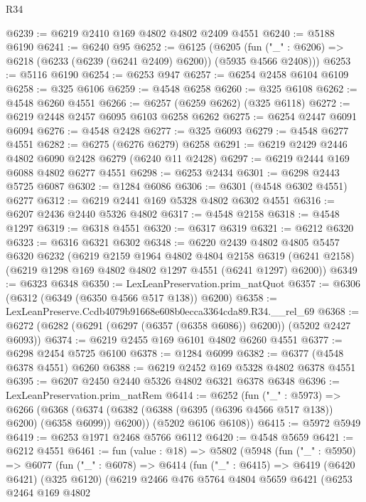 \begin{lexlean}{R34}
\begin{coremodule}
@6239 := @6219 @2410 @169 @4802 @4802 @2409 @4551
@6240 := @5188 @6190
@6241 := @6240 @95
@6252 := @6125
    (@6205 (fun ("_" : @6206) => @6218 (@6233 (@6239 (@6241 @2409) @6200)) (@5935 @4566 @2408)))
@6253 := @5116 @6190
@6254 := @6253 @947
@6257 := @6254 @2458 @6104 @6109
@6258 := @325 @6106
@6259 := @4548 @6258
@6260 := @325 @6108
@6262 := @4548 @6260 @4551
@6266 := @6257 (@6259 @6262) (@325 @6118)
@6272 := @6219 @2448 @2457 @6095 @6103 @6258 @6262
@6275 := @6254 @2447 @6091 @6094
@6276 := @4548 @2428
@6277 := @325 @6093
@6279 := @4548 @6277 @4551
@6282 := @6275 (@6276 @6279) @6258
@6291 := @6219 @2429 @2446 @4802 @6090 @2428 @6279 (@6240 @11 @2428)
@6297 := @6219 @2444 @169 @6088 @4802 @6277 @4551
@6298 := @6253 @2434
@6301 := @6298 @2443 @5725 @6087
@6302 := @1284 @6086
@6306 := @6301 (@4548 @6302 @4551) @6277
@6312 := @6219 @2441 @169 @5328 @4802 @6302 @4551
@6316 := @6207 @2436 @2440 @5326 @4802
@6317 := @4548 @2158
@6318 := @4548 @1297
@6319 := @6318 @4551
@6320 := @6317 @6319
@6321 := @6212 @6320
@6323 := @6316 @6321 @6302
@6348 := @6220
    @2439
    @4802
    @4805
    @5457
    @6320
    @6232
    (@6219
      @2159
      @1964
      @4802
      @4804
      @2158
      @6319
      (@6241 @2158)
      (@6219 @1298 @169 @4802 @4802 @1297 @4551 (@6241 @1297) @6200))
@6349 := @6323 @6348
@6350 := LexLeanPreservation.prim_natQuot
@6357 := @6306 (@6312 (@6349 (@6350 @4566 @517 @138)) @6200)
@6358 := LexLeanPreserve.Ccdb4079b91668e608b0ecca3364cda89.R34.__rel_69
@6368 := @6272 (@6282 (@6291 (@6297 (@6357 (@6358 @6086)) @6200)) (@5202 @2427 @6093))
@6374 := @6219 @2455 @169 @6101 @4802 @6260 @4551
@6377 := @6298 @2454 @5725 @6100
@6378 := @1284 @6099
@6382 := @6377 (@4548 @6378 @4551) @6260
@6388 := @6219 @2452 @169 @5328 @4802 @6378 @4551
@6395 := @6207 @2450 @2440 @5326 @4802 @6321 @6378 @6348
@6396 := LexLeanPreservation.prim_natRem
@6414 := @6252
    (fun ("_" : @5973) =>
    @6266
      (@6368 (@6374 (@6382 (@6388 (@6395 (@6396 @4566 @517 @138)) @6200) (@6358 @6099)) @6200))
      (@5202 @6106 @6108))
@6415 := @5972 @5949
@6419 := @6253 @1971 @2468 @5766 @6112
@6420 := @4548 @5659
@6421 := @6212 @4551
@6461 := fun (value : @18) =>
  @5802
    (@5948
      (fun ("_" : @5950) =>
      @6077
        (fun ("_" : @6078) =>
        @6414
          (fun ("_" : @6415) =>
          @6419
            (@6420 @6421)
            (@325 @6120)
            (@6219
              @2466
              @476
              @5764
              @4804
              @5659
              @6421
              (@6253
                @2464
                @169
                @4802

\end{coremodule}
\end{lexlean}
